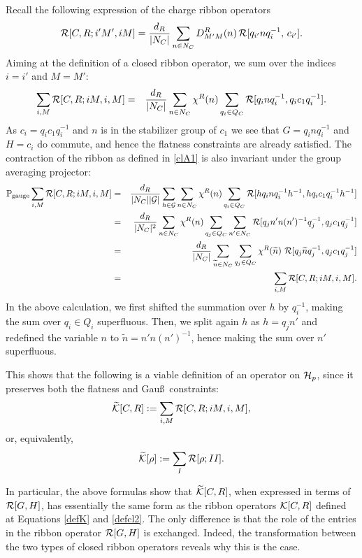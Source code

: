 \documentclass[nofootinbib,superscriptaddress,eqsecnum,tightenlines,11pt]{revtex4-1}
\def\nn{\nonumber}
\def\be{\begin{equation}}
\def\ee{\end{equation}}
\def\ba{\begin{eqnarray}}
\def\ea{\end{eqnarray}}
\renewcommand{\tilde}{\widetilde}
\begin{document}
Recall the following expression of the charge ribbon operators
\be
	{\cal R}[C,R;i'M',iM]= \frac{d_R}{|N_C|} \sum_{n\in N_C} D^R_{M'M}(n) \, {\cal R}[q_{i'}nq_i^{-1},\,c_{i'}]  .
\ee
Aiming at the definition of a closed ribbon operator, we sum over the indices $i=i'$ and $M=M'$:
\ba\label{clA1}
\sum_{i,M}{\cal R}[C,R;iM,i,M]&=& \frac{d_R}{|N_C|} \sum_{n\in N_C}  \chi^R(n)  \sum_{q_i \in Q_C} {\cal R}[q_inq_i^{-1},q_i c_1 q^{-1}_i]  .
\ea
As $c_i=q_ic_1 q_i^{-1}$ and $n$ is in the stabilizer group of $c_1$ we see that  $G=q_inq_i^{-1}$ and $H=c_i$ do commute, and hence the flatness constraints are already satisfied.
The contraction of the ribbon as defined in \eqref{clA1} is also invariant under the group averaging projector:
\ba
{\mathbb P}_\text{gauge} \sum_{i,M}{\cal R}[C,R;iM,i,M]
&=& \frac{d_R}{|N_C||\cal G|} \sum_{h \in {\cal G}}\sum_{n\in N_C}  \chi^R(n)  \sum_{q_i \in Q_C} {\cal R}[h q_inq_i^{-1} h^{-1}, hq_i c_1 q^{-1}_ih^{-1}]  \nn\\
&=&
 \frac{d_R}{|N_C|^2} \sum_{n\in N_C}  \chi^R(n)   \sum_{q_j \in Q_C} \sum_{n' \in N_C}    {\cal R}[q_j n' n (n')^{-1}q_j^{-1}, q_j c_1 q_j^{-1}] \nn\\
&=&  \frac{d_R}{|N_C|} \sum_{\tilde n \in N_C} \sum_{q_j \in Q_C} \chi^R(\tilde n)\,\, {\cal R}[q_j \tilde n q_j^{-1}, q_j c_1 q_j^{-1}]\nn\\
&=&  \sum_{i,M}{\cal R}[C,R;iM,i,M]  .
\ea
In the above calculation, we first shifted the summation over $h$ by $q_i^{-1}$, making the sum over $q_i \in Q_i$ superfluous. Then, we split again $h$ as $h=q_j n'$ and redefined the variable $n$ to $\tilde n=n' n (n')^{-1}$, hence making the sum over $n'$ superfluous. %

This shows that the following is a viable definition of an operator on ${\cal H}_{p}$, since it preserves both the flatness and Gau\ss~constraints:
\be
\tilde {\cal K} [C,R] := \sum_{i,M}{\cal R}[C,R;iM,i,M],
\ee
or, equivalently,
\be
\tilde {\cal K} [\rho] := \sum_{I}{\cal R}[\rho;I I].
\ee

In particular, the above formulas show that $\tilde{\cal K}[C,R]$, when expressed in terms of ${\cal R}[G,H]$, has essentially  the same form as the ribbon operators ${\cal K}[C,R]$ defined at Equations \eqref{defK} and \eqref{defcl2}.
The only difference is that the role of the entries in the ribbon operator ${\cal R}[G,H]$ is exchanged. 
Indeed, the transformation between the two types of closed ribbon operators reveals why this is the case. 
\end{document}
